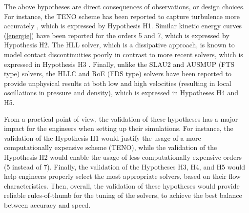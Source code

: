 The above hypotheses are direct consequences of
observations, or
design choices. For instance, the TENO scheme has been reported to capture turbulence more accurately \cite{peng2021efficient}, which is expressed by Hypothesis H1. Similar kinetic energy curves (\autoref{energie}) have been reported for the orders 5 and 7, which is expressed by Hypothesis H2. The HLL solver, which is a dissipative approach, is known to model contact discontinuities poorly in contrast to more recent solvers, which is expressed in Hypothesis H3 \cite{toro2013riemann}. Finally, unlike the SLAU2 and AUSMUP (FTS type) solvers, the HLLC and RoE (FDS type) solvers have been reported to provide unphysical results at both low and high velocities (resulting in local oscillations in pressure and density), which is expressed in Hypotheses H4 and H5. %

From a practical point of view, the validation of these hypotheses has a major impact for the engineers when setting up their simulations. For instance, the validation of the Hypothesis H1 would justify the usage of a more computationally expensive scheme (TENO), while the validation of the Hypothesis H2 would enable the usage of less computationally expensive orders (5 instead of 7). Finally, the validation of the Hypotheses H3, H4, and H5 would help engineers properly select the most appropriate solvers, based on their flow characteristics.
Then, overall, the validation of these hypotheses
would provide reliable rules-of-thumb for the tuning of the solvers,
to achieve the best balance between accuracy and speed.





